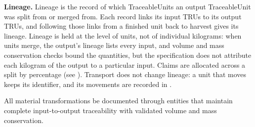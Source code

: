 \textbf{Lineage.} Lineage is the record of which TraceableUnits an output TraceableUnit was split from or merged from. Each  record links its input TRUs to its output TRUs, and following those links from a finished unit back to harvest gives its lineage. Lineage is held at the level of units, not of individual kilograms: when units merge, the output's lineage lists every input, and volume and mass conservation checks bound the quantities, but the specification does not attribute each kilogram of the output to a particular input. Claims are allocated across a split by percentage (see ). Transport does not change lineage: a unit that moves keeps its identifier, and its movements are recorded in .

\begin{normative}[title=Processing Chain Requirements]
All material transformations \MUST{} be documented through  entities that maintain complete input-to-output traceability with validated volume and mass conservation.
\end{normative}